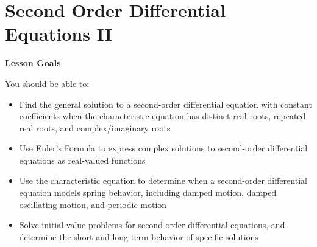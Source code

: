 \documentclass[main]{subfiles}
\begin{document}
\ifSubfilesClassLoaded{%
  \chaptermark{\chapterthree}
}{}

\section{Second Order Differential Equations II} \label{ws3-7}
\begin{framed}
\centerline{\textbf{Lesson Goals}}

You should be able to:
\begin{itemize}
\item Find the general solution to a second-order differential equation with constant coefficients when the characteristic equation has distinct real roots, repeated real roots, and complex/imaginary roots
\item Use Euler's Formula to express complex solutions to second-order differential equations as real-valued functions
\item Use the characteristic equation to determine when a second-order differential equation models spring behavior, including damped motion, damped oscillating motion, and periodic motion 
\item Solve initial value problems for second-order differential equations, and determine the short and long-term behavior of specific solutions
\end{itemize}
\end{framed}
\end{document}
